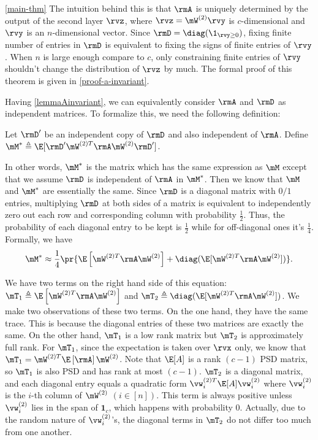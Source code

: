 \begin{proofof}{\cref{main-thm}}
The intuition behind this is that $\rmA$ is uniquely determined by the output of the second layer $\rvz$, where $\rvz=\mW^{(2)}\rvy$ is $c$-dimensional and $\rvy$ is an $n$-dimensional vector. Since $\rmD=\diag(\1_{\rvy\geq 0})$, fixing finite number of entries in $\rmD$ is equivalent to fixing the signs of finite entries of $\rvy$. When $n$ is large enough compare to $c$, only constraining finite entries of $\rvy$ shouldn't change the distribution of $\rvz$ by much. The formal proof of this theorem is given in \cref{proof-a-invariant}.

Having \cref{lemmaAinvariant}, we can equivalently consider $\rmA$ and $\rmD$ as independent matrices. To formalize this, we need the following definition:
\begin{definition}
Let $\rmD'$ be an independent copy of $\rmD$ and also independent of $\rmA$. Define $\mM^*\triangleq\E[\rmD'\mW^{(2)T}\rmA\mW^{(2)}\rmD']$.
\end{definition}
In other words, $\mM^*$ is the matrix which has the same expression as $\mM$ except that we assume $\rmD$ is independent of $\rmA$ in $\mM^*$. Then we know that $\mM$ and $\mM^*$ are essentially the same. Since $\rmD$ is a diagonal matrix with $0/1$ entries, multiplying $\rmD$ at both sides of a matrix is equivalent to independently zero out each row and corresponding column with probability $\frac12$. Thus, the probability of each diagonal entry to be kept is $\frac12$ while for off-diagonal ones it's $\frac14$. Formally, we have
\begin{equation}
\mM^*\approx\frac14\pr{\E\left[\mW^{(2)T}\rmA\mW^{(2)}\right]+\diag(\E[\mW^{(2)T}\rmA\mW^{(2)}])}.
\end{equation}

We have two terms on the right hand side of this equation: $\mT_1\triangleq\E\left[\mW^{(2)T}\rmA\mW^{(2)}\right]$ and $\mT_2\triangleq\diag(\E[\mW^{(2)T}\rmA\mW^{(2)}])$. We make two observations of these two terms. On the one hand, they have the same trace. This is because the diagonal entries of these two matrices are exactly the same. On the other hand, $\mT_1$ is a low rank matrix but $\mT_2$ is approximately full rank. For $\mT_1$, since the expectation is taken over $\rvx$ only, we know that $\mT_1=\mW^{(2)T}\E\left[\rmA\right]\mW^{(2)}$. Note that $\E[A]$ is a rank $(c-1)$ PSD matrix, so $\mT_1$ is also PSD and has rank at most $(c-1)$. $\mT_2$ is a diagonal matrix, and each diagonal entry equals a quadratic form $\vw^{(2)T}_i\E[A]\vw^{(2)}_i$ where $\vw^{(2)}_i$ is the $i$-th column of $\mW^{(2)}$ $(i\in[n])$. This term is always positive unless $\vw^{(2)}_i$ lies in the span of $\textbf{1}_c$, which happens with probability 0. Actually, due to the random nature of $\vw^{(2)}_i$'s, the diagonal terms in $\mT_2$ do not differ too much from one another.


\end{proofof}
